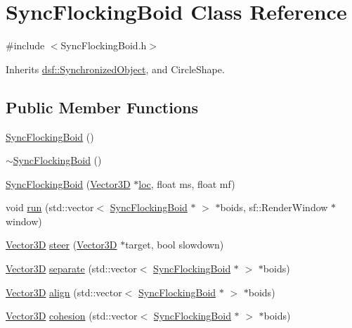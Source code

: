 \hypertarget{class_sync_flocking_boid}{}\section{Sync\+Flocking\+Boid Class Reference}
\label{class_sync_flocking_boid}


{\ttfamily \#include $<$Sync\+Flocking\+Boid.\+h$>$}



Inherits \hyperlink{classdsf_1_1_synchronized_object}{dsf\+::\+Synchronized\+Object}, and Circle\+Shape.

\subsection*{Public Member Functions}
\begin{DoxyCompactItemize}
\item 
\hyperlink{class_sync_flocking_boid_a76ceab54bd8eec11f04c11f557f24100}{Sync\+Flocking\+Boid} ()
\item 
\hyperlink{class_sync_flocking_boid_a2a7c4d7467f92cd223b1ab5290be9f05}{$\sim$\+Sync\+Flocking\+Boid} ()
\item 
\hyperlink{class_sync_flocking_boid_ac136f832c43c76135ad2cd80e549320f}{Sync\+Flocking\+Boid} (\hyperlink{class_vector3_d}{Vector3\+D} $\ast$\hyperlink{class_sync_flocking_boid_a1448999018acaa4ec3117ee2bbee2b02}{loc}, float ms, float mf)
\item 
void \hyperlink{class_sync_flocking_boid_a5756920e77254f47a358256f0c317716}{run} (std\+::vector$<$ \hyperlink{class_sync_flocking_boid}{Sync\+Flocking\+Boid} $\ast$ $>$ $\ast$boids, sf\+::\+Render\+Window $\ast$window)
\item 
\hyperlink{class_vector3_d}{Vector3\+D} \hyperlink{class_sync_flocking_boid_af08726d6328bb3d507d8630ba9090e17}{steer} (\hyperlink{class_vector3_d}{Vector3\+D} $\ast$target, bool slowdown)
\item 
\hyperlink{class_vector3_d}{Vector3\+D} \hyperlink{class_sync_flocking_boid_a372baffa82756888408de186ea06715b}{separate} (std\+::vector$<$ \hyperlink{class_sync_flocking_boid}{Sync\+Flocking\+Boid} $\ast$ $>$ $\ast$boids)
\item 
\hyperlink{class_vector3_d}{Vector3\+D} \hyperlink{class_sync_flocking_boid_afdffc148b6eb1062aac75fe081af344f}{align} (std\+::vector$<$ \hyperlink{class_sync_flocking_boid}{Sync\+Flocking\+Boid} $\ast$ $>$ $\ast$boids)
\item 
\hyperlink{class_vector3_d}{Vector3\+D} \hyperlink{class_sync_flocking_boid_a369309343183c3145da610b82ec1e621}{cohesion} (std\+::vector$<$ \hyperlink{class_sync_flocking_boid}{Sync\+Flocking\+Boid} $\ast$ $>$ $\ast$boids)
\end{DoxyCompactItemize}
